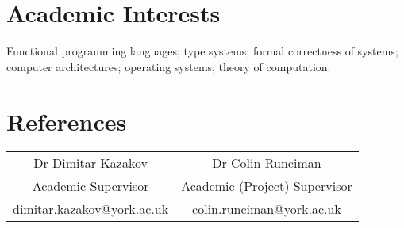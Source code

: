 \documentclass[a4paper,10pt]{article}
\newcommand{\mhref}[1]{\href{mailto:#1}{#1}}
\begin{document}
\section{Academic Interests}
Functional programming languages; type systems; formal correctness of systems; computer architectures; operating systems; theory of computation.

\section{References}
\begin{tabular}{c c}
  Dr Dimitar Kazakov                 & Dr Colin Runciman\\
  Academic Supervisor                & Academic (Project) Supervisor\\
  \mhref{dimitar.kazakov@york.ac.uk} & \mhref{colin.runciman@york.ac.uk}\\
\end{tabular}
\end{document}
